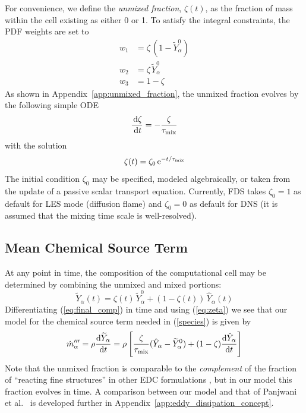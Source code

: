 For convenience, we define the \emph{unmixed fraction}, $\zeta(t)$, as the fraction of mass within the cell existing as either 0 or 1.  To satisfy the integral constraints, the PDF weights are set to
\begin{align}
w_1 &= \zeta \, (1 - \widetilde{Y}_\alpha^0) \\
w_2 &= \zeta \, \widetilde{Y}_\alpha^0 \\
w_3 &= 1-\zeta 
\end{align}
As shown in Appendix~\ref{app:unmixed_fraction}, the unmixed fraction evolves by the following simple ODE
\begin{equation}
\label{eq:zeta}
\frac{\,\mathrm{d} \zeta}{\,\mathrm{d} t}=-\frac{\zeta}{\tau_{\rm mix}}
\end{equation}
with the solution
\begin{equation}
\label{eq:zeta_soln}
\zeta(t) = \zeta_0 \,{\rm e}^{-t/\tau_{\rm mix}}
\end{equation}
The initial condition $\zeta_0$ may be specified, modeled algebraically, or taken from the update of a passive scalar transport equation.  Currently, FDS takes $\zeta_0=1$ as default for LES mode (diffusion flame) and $\zeta_0=0$ as default for DNS (it is assumed that the mixing time scale is well-resolved).


\subsection{Mean Chemical Source Term}
\label{source_term}

At any point in time, the composition of the computational cell may be determined by combining the unmixed and mixed portions:
\begin{equation}
\label{eq:final_comp}
\widetilde{Y}_{\alpha}(t)= \zeta(t) \, \widetilde{Y}_{\alpha}^0 + (1-\zeta(t)) \, \hat{Y}_{\alpha}(t)
\end{equation}
Differentiating (\ref{eq:final_comp}) in time and using (\ref{eq:zeta}) we see that our model for the chemical source term needed in (\ref{species}) is given by
\begin{equation}
\label{mass_prod_rate} 
\dot{m}^{\prime\prime\prime}_{\alpha} = \rho \frac{\mbox{d}\widetilde{Y}_{\alpha}}{\mbox{d}t} 
= \rho \left[ \frac{\zeta}{\tau_{\rm{mix}}} (\hat{Y}_\alpha - \widetilde{Y}_{\alpha}^0)  + (1-\zeta) \frac{\mbox{d}\hat{Y}_\alpha}{\mbox{d}t} \right]
\end{equation}
Note that the unmixed fraction is comparable to the \emph{complement} of the fraction of ``reacting fine structures'' in other EDC formulations \cite{Chen:1,Panjwani:2010}, but in our model this fraction evolves in time.  A comparison between our model and that of Panjwani et al.~\cite{Panjwani:2010} is developed further in Appendix~\ref{app:eddy_dissipation_concept}.

